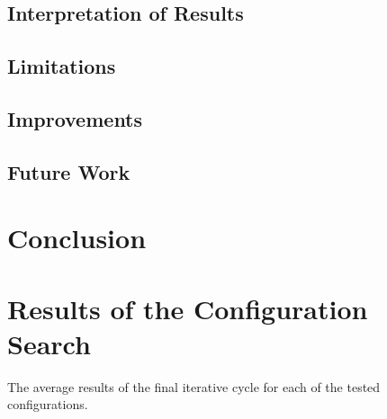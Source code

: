 \documentclass[12pt,a4paper]{report}
\begin{document}
\section{Interpretation of Results}


\section{Limitations}


\section{Improvements}



\section{Future Work}








\chapter{Conclusion}
\label{ch:conclusion}







\printbibliography

\appendix
\chapter{Results of the Configuration Search}
\begin{table}
    \centering
    
    \caption{The average results of the final iterative cycle for each of the tested configurations.}
    \label{app:avg-viability}
\end{table}
\end{document}
